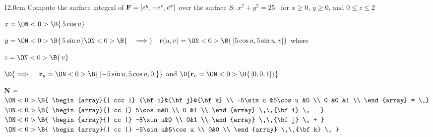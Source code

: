 \begin{frame}
\begin{columns}\begin{column}{12.0cm}
\scriptsize
\EX Compute the surface integral of ${\bf F} = [e^y, -e^z, e^x]$ over the surface $S:\, x^2 + y^2 = 25$ \, for $x \ge 0$, $y \ge 0$, and $0 \le z \le 2$

\vspace{0.2cm}

\quad $
x =
\ON<0>{\B{\,5 \cos u}}$

\quad $
y =
\ON<0>{\B{\,5 \sin u}}
\ON<0>{\B{\quad \implies}} \quad {\bf r}(u,v) =
\ON<0>{\B{\, [5\cos u,5 \sin u,v]}}$ \qquad where \quad
{}

\quad $
z =
\ON<0>{\B{\,v}}$

\vspace{0.2cm}
\hspace{1.3cm} $\D{
\implies \quad {\bf r}_u =
\ON<0>{\B{\, [-5\sin u,5\cos u,0]}}}$ \qquad 
and
\qquad $\D{
{\bf r}_v = 
\ON<0>{\B{\,[0,0,1]}}}$

\vspace{0.3cm}

{\bf N} = \,
$\ON<0>{\B{
\begin{array}{| ccc |}
	{\bf i}&{\bf j}&{\bf k} \\
	-5\sin u      &5\cos u     &0 \\
 	0      &0      &1 \\
\end{array}
= \,}}$
$\ON<0>{\B{
\begin{array}{| cc |}
		  5\cos u&0 \\
 		  0 &1 \\
\end{array}
 \,\,{\bf i} \, - }}$\,\,
$\ON<0>{\B{
\begin{array}{| cc |}
		  -5\sin u&0 \\
 		  0&1 \\
\end{array}
 \,\,{\bf j} \, + }}$\,\,
$\ON<0>{\B{
\begin{array}{| cc |}
		  -5\sin u&5\cos u \\
 		  0&0 \\
\end{array}
\,\,{\bf k} \, }}$\\

\vspace{0.3cm}


\end{column}
\end{columns}
\end{frame}
